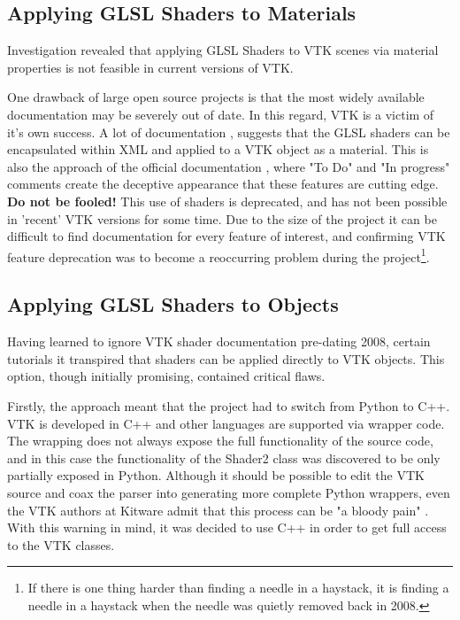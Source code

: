 \documentclass[MSc,paper=a4,pagesize=auto]{icldt}
\begin{document}
\subsection{Applying GLSL Shaders to Materials}
Investigation revealed that applying GLSL Shaders to VTK scenes via material properties is not feasible in current versions of VTK.

One drawback of large open source projects is that the most widely available documentation may be severely out of date. In this regard, VTK is a victim of it's own success. A lot of documentation \cite{Seip2005}, \cite{OBrien2009} suggests that the GLSL shaders can be encapsulated within XML and applied to a VTK object as a material. This is also the approach of the official documentation \cite{VTK_XML_shaders}, where "To Do" and "In progress" comments create the deceptive appearance that these features are cutting edge. \textbf{Do not be fooled!} This use of shaders is deprecated, and has not been possible in 'recent' VTK versions for some time. Due to the size of the project it can be difficult to find documentation for every feature of interest, and confirming VTK feature deprecation was to become a reoccurring problem during the project\footnote{If there is one thing harder than finding a needle in a haystack, it is finding a needle in a haystack when the needle was quietly removed back in 2008.}.

\subsection{Applying GLSL Shaders to Objects}
Having learned to ignore VTK shader documentation pre-dating 2008, certain tutorials it transpired that shaders can be applied directly to VTK objects. This option, though initially promising, contained critical flaws. 

Firstly, the approach meant that the project had to switch from Python to C++. VTK is developed in C++ and other languages are supported via wrapper code. The wrapping does not always expose the full functionality of the source code, and in this case the functionality of the Shader2 class was discovered to be only partially exposed in Python. Although it should be possible to edit the VTK source and coax the parser into generating more complete Python wrappers, even the VTK authors at Kitware admit that this process can be "a bloody pain" \cite{VTK_Wrapper_FAQ}. With this warning in mind, it was decided to use C++ in order to get full access to the VTK classes.
\end{document}
